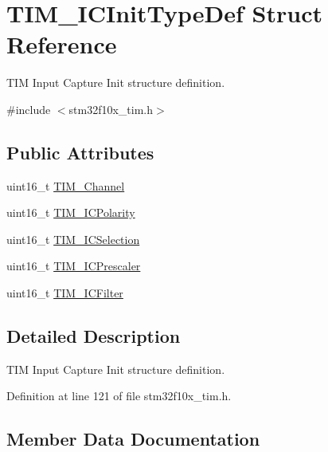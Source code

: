 \hypertarget{struct_t_i_m___i_c_init_type_def}{}\section{T\+I\+M\+\_\+\+I\+C\+Init\+Type\+Def Struct Reference}
\label{struct_t_i_m___i_c_init_type_def}


T\+IM Input Capture Init structure definition.  




{\ttfamily \#include $<$stm32f10x\+\_\+tim.\+h$>$}

\subsection*{Public Attributes}
\begin{DoxyCompactItemize}
\item 
uint16\+\_\+t \hyperlink{struct_t_i_m___i_c_init_type_def_ab9404ee3d95aaa7a478ed99562c736d2}{T\+I\+M\+\_\+\+Channel}
\item 
uint16\+\_\+t \hyperlink{struct_t_i_m___i_c_init_type_def_a234c284efc36c0cc15a2ed0fb4435557}{T\+I\+M\+\_\+\+I\+C\+Polarity}
\item 
uint16\+\_\+t \hyperlink{struct_t_i_m___i_c_init_type_def_a00b9a72e895a43dc18c69c96a149f080}{T\+I\+M\+\_\+\+I\+C\+Selection}
\item 
uint16\+\_\+t \hyperlink{struct_t_i_m___i_c_init_type_def_ac61c7fc999ace295ac81b304cabd61e0}{T\+I\+M\+\_\+\+I\+C\+Prescaler}
\item 
uint16\+\_\+t \hyperlink{struct_t_i_m___i_c_init_type_def_a72539caa6e965e4fa89e3b21b188cf26}{T\+I\+M\+\_\+\+I\+C\+Filter}
\end{DoxyCompactItemize}


\subsection{Detailed Description}
T\+IM Input Capture Init structure definition. 

Definition at line 121 of file stm32f10x\+\_\+tim.\+h.



\subsection{Member Data Documentation}
\mbox{\label{struct_t_i_m___i_c_init_type_def_ab9404ee3d95aaa7a478ed99562c736d2}} 
